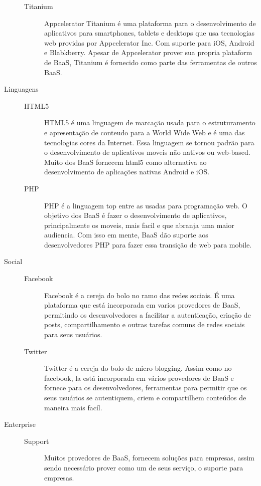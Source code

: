 \begin{description}
\begin{description}
				\item[Titanium] { Appcelerator Titanium é uma plataforma para o desenvolvimento de aplicativos para smartphones, tablets e desktops que usa tecnologias web providas por Appcelerator Inc. Com suporte para iOS, Android e Blabkberry. Apesar de Appcelerator prover sua propria plataform de BaaS, Titanium é fornecido como parte das ferramentas de outros BaaS.}
			\end{description}

		\item[Linguagens]
			\begin{description}
				\item[]
                \item[HTML5] { HTML5 é uma linguagem de marcação usada para o estruturamento e apresentação de conteudo para a World Wide Web e é uma das tecnologias cores da Internet. Essa linguagem se tornou padrão para o desenvolvimento de aplicativos moveis não nativos ou web-based. Muito dos BaaS fornecem html5 como alternativa ao desenvolvimento de aplicações nativas Android e iOS.}

				\item[PHP] { PHP é a linguagem top entre as usadas para programação web. O objetivo dos BaaS é fazer o desenvolvimento de aplicativos, principalmente os moveis, mais facil e que abranja uma maior audiencia. Com isso em mente, BaaS dão suporte aos desenvolvedores PHP para fazer essa transição de web para mobile.}
			\end{description}

		\item[Social]
			\begin{description}
				\item[]
                \item[Facebook] { Facebook é a cereja do bolo no ramo das redes sociais. É uma plataforma que está incorporada em varios provedores de BaaS, permitindo os desenvolvedores a facilitar a autenticação, criação de posts, compartilhamento e outras tarefas comuns de redes sociais para seus usuários. }

				\item[Twitter] { Twitter é a cereja do bolo de micro blogging. Assim como no facebook, la está incorporada em vários provedores de BaaS e fornece para os desenvolvedores, ferramentas para permitir que os seus usuários se autentiquem, criem e compartilhem conteúdos de maneira mais facíl. }
			\end{description}

		\item[Enterprise]
			\begin{description}
				\item[] 
                \item[Support] { Muitos provedores de BaaS, fornecem soluções para empresas, assim sendo necessário prover como um de seus serviço, o suporte para empresas.}
			\end{description}
	\end{description}

